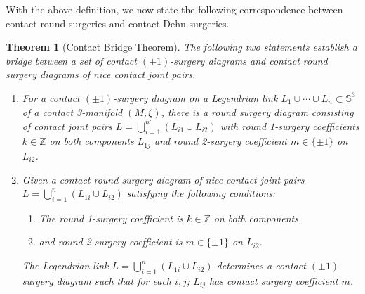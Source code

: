 \documentclass{amsart}
\theoremstyle{plain}
\newtheorem{thm}{Theorem}
\theoremstyle{remark}
\theoremstyle{definition}
\newcommand{\s}{\mathbb{S}}
\begin{document}
With the above definition, we now state the following correspondence between contact round surgeries and contact Dehn surgeries.

\begin{thm}[Contact Bridge Theorem]\label{thm: ContBridgeThm}
The following two statements establish a bridge between a set of contact $(\pm1)$-surgery diagrams and contact round surgery diagrams of nice contact joint pairs. 
\begin{enumerate}
    \item [(1)] For a contact $(\pm1)$-surgery diagram on a Legendrian link $L_1 \cup \cdots \cup L_n \subset \s^3$ of a contact 3-manifold $(M, \xi)$, there is a round surgery diagram consisting of contact joint pairs $L= \bigcup_{i=1}^{n'} (L_{i1}\cup L_{i2})$ with round 1-surgery coefficients $k\in \mathbb{Z} $ on both components $L_{1j}$ and round 2-surgery coefficient $m \in \{\pm1\}$ on $L_{i2}$. 
    \item [(2)]Given a contact round surgery diagram of nice contact joint pairs $L= \bigcup_{i=1}^{n} (L_{1i}\cup L_{i2})$ satisfying the following conditions: 
    \begin{enumerate}
        \item The round 1-surgery coefficient is $k \in  \mathbb{Z}$ on both components, 
        \item and round 2-surgery coefficient is $m\in \{\pm1\}$ on $L_{i2}$. 
    \end{enumerate}
    The Legendrian link $L= \bigcup_{i=1}^{n} (L_{1i}\cup L_{i2})$ determines a contact $(\pm1)$-surgery diagram such that for each $i,j$; $L_{ij}$ has contact surgery coefficient $m$. 
\end{enumerate}
    
\end{thm}
\end{document}
